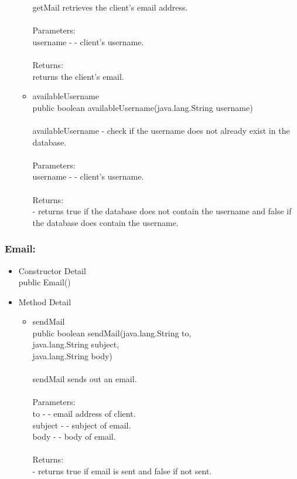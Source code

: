 \documentclass[letterpaper]{article}
\begin{document}
\begin{itemize}
\begin{itemize}
											getMail retrieves the client's email address. \\ \\
											Parameters: \\
											username - - client's username. \\ \\
											Returns: \\
											returns the client's email.
									\item	availableUsername \\
											public boolean availableUsername(java.lang.String username) \\ \\
											availableUsername - check if the username does not already exist in the database. \\ \\
											Parameters: \\
											username - - client's username. \\ \\
											Returns: \\
											- returns true if the database does not contain the username and false if the database does contain the username.
								\end{itemize}
					\end{itemize}
					
				\vspace{0.2in}
				\subsubsection*{Email:}
				\vspace{0.1in}	
					\begin{itemize}
						\item	Constructor Detail \\
								public Email()
						\item	Method Detail
								\begin{itemize}
									\item	sendMail \\
											public boolean sendMail(java.lang.String to, \\
		               java.lang.String subject, \\
		               java.lang.String body) \\ \\
											sendMail sends out an email. \\ \\
											Parameters: \\
											to - - email address of client.	\\
											subject - - subject of email. \\
											body - - body of email. \\ \\
											Returns: \\
											- returns true if email is sent and false if not sent.
								\end{itemize}
					\end{itemize}
		
		\vspace{0.2in}
		
\end{document}

